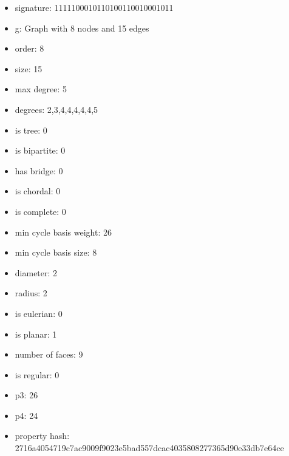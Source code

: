 \begin{itemize}
\item signature: 1111100010110100110010001011
\item g: Graph with 8 nodes and 15 edges
\item order: 8
\item size: 15
\item max degree: 5
\item degrees: 2,3,4,4,4,4,4,5
\item is tree: 0
\item is bipartite: 0
\item has bridge: 0
\item is chordal: 0
\item is complete: 0
\item min cycle basis weight: 26
\item min cycle basis size: 8
\item diameter: 2
\item radius: 2
\item is eulerian: 0
\item is planar: 1
\item number of faces: 9
\item is regular: 0
\item p3: 26
\item p4: 24
\item property hash: 2716a4054719c7ac9009f9023e5bad557dcac4035808277365d90e33db7e64ce
\end{itemize}
\newpage
\begin{figure}
\end{figure}
